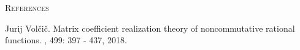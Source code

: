 \vspace{1em}

\begin{center}
	{\normalsize \textsc{References}}
\end{center}


\begin{thebibliography}{Vol18}

Jurij Vol{\v c}i{\v c}.
\newblock Matrix coefficient realization theory of noncommutative rational functions.
, 499: 397 - 437, 2018.
\end{thebibliography}


\endgroup




